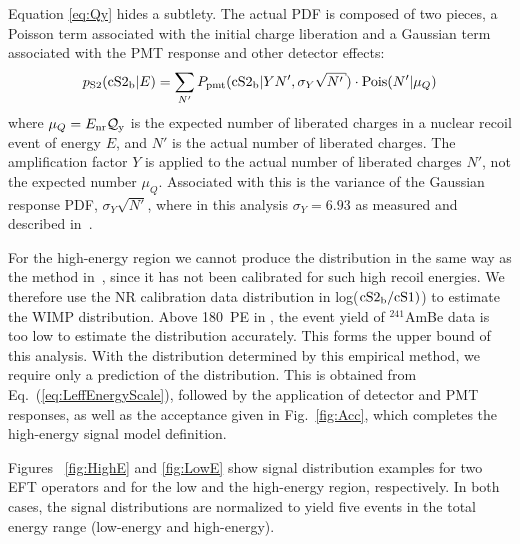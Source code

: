 Equation \ref{eq:Qy} hides a subtlety. The actual \cSiib{} PDF is composed of two pieces, a Poisson term associated with the initial charge liberation and a Gaussian term associated with the PMT response and other detector effects:
%
\begin{equation}
\label{eq.cS2pdf}
p_\mathrm{S2}(\mathrm{\cSiib}|E) = \sum_{N'} P_\mathrm{pmt}(\mathrm{\cSiib}|Y N',\sigma_Y \sqrt{N'})\cdot\mathrm{Pois}(N'|\mu_Q)
\end{equation}
%
where $\mu_Q=E_{\mathrm{nr}}\mathcal{Q}_{\mathrm{y}}$ is the expected number of liberated charges in a nuclear recoil event of energy $E$, and $N'$ is the actual number of liberated charges. The amplification factor $Y$ is applied to the actual number of liberated charges $N'$, not the expected number $\mu_Q$. Associated with this is the variance of the Gaussian response PDF, $\sigma_Y\sqrt{N'}$, where in this analysis $\sigma_Y = 6.93$ as measured and described in~\cite{XenonSingleElectron}. 

For the high-energy region we cannot produce the \Sii{} distribution in the same way as the method in~\cite{DataMCXenon}, since it  has not been calibrated for such high recoil energies. We therefore use the NR calibration data distribution in log($\mathrm{\mathrm{cS2}_\mathrm{b}/\mathrm{cS1})}$) to estimate the WIMP distribution. Above 180~PE in \cSi{}, the event yield of $^{241}$AmBe data is too low to estimate the distribution accurately. This forms the upper bound of this analysis. With the \cSiib{} distribution determined by this empirical method, we require only a prediction of the \cSi{} distribution. This is obtained from Eq.~(\ref{eq:LeffEnergyScale}), followed by the application of detector and PMT responses, as well as the acceptance given in Fig.~\ref{fig:Acc}, which completes the high-energy signal model definition.

Figures ~\ref{fig:HighE} and \ref{fig:LowE} show signal distribution examples for two EFT operators and for the low and the high-energy region, respectively.
In both cases, the signal distributions are normalized to yield five events in the total energy range (low-energy and high-energy).

